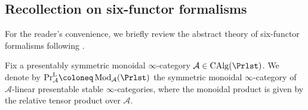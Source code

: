 \subsection{Recollection on six-functor formalisms}

For the reader's convenience, we briefly review the abstract theory of six-functor formalisms following \cite{Liu_Zheng2012, Mann2022, Scholze2025, Cnossen_Lenz_Linskens2026}.

Fix a presentably symmetric monoidal $\infty$-category $\mathcal A \in \operatorname{CAlg}(\Prlst)$. We denote by $\mathrm{Pr}^{\mathrm{L}}_{\mathcal A} \coloneq \operatorname{Mod}_{\mathcal A}(\Prlst)$ the symmetric monoidal $\infty$-category of $\mathcal A$-linear presentable stable $\infty$-categories, where the monoidal product is given by the relative tensor product over $\mathcal A$. 

